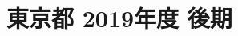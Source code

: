 \documentclass[../../hsm_tok_q.tex]{subfiles}
\begin{document}
    \section{東京都 2019年度 後期}
    \subsection{　}
    
    \newpage
    \subsection{　}
    
    \newpage
    \subsection{　}
    
    \newpage
    \subsection{　}
    
    \newpage
    \subsection{　}
    
\end{document}
